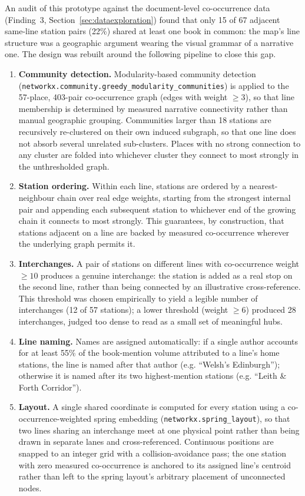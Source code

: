 \documentclass[logo,msc]{infthesis}
\begin{document}
\label{sec:metro-redesign}
An audit of this prototype against the document-level co-occurrence data (Finding~3, Section~\ref{sec:dataexploration}) found that only 15 of 67 adjacent same-line station pairs (22\%) shared at least one book in common: the map's line structure was a geographic argument wearing the visual grammar of a narrative one. The design was rebuilt around the following pipeline to close this gap.

\begin{enumerate}
  \item \textbf{Community detection.} Modularity-based community detection (\texttt{networkx.community.greedy\_modularity\_communities}) is applied to the 57-place, 403-pair co-occurrence graph (edges with weight $\geq 3$), so that line membership is determined by measured narrative connectivity rather than manual geographic grouping. Communities larger than 18 stations are recursively re-clustered on their own induced subgraph, so that one line does not absorb several unrelated sub-clusters. Places with no strong connection to any cluster are folded into whichever cluster they connect to most strongly in the unthresholded graph.
  \item \textbf{Station ordering.} Within each line, stations are ordered by a nearest-neighbour chain over real edge weights, starting from the strongest internal pair and appending each subsequent station to whichever end of the growing chain it connects to most strongly. This guarantees, by construction, that stations adjacent on a line are backed by measured co-occurrence wherever the underlying graph permits it.
  \item \textbf{Interchanges.} A pair of stations on different lines with co-occurrence weight $\geq 10$ produces a genuine interchange: the station is added as a real stop on the second line, rather than being connected by an illustrative cross-reference. This threshold was chosen empirically to yield a legible number of interchanges (12 of 57 stations); a lower threshold (weight $\geq 6$) produced 28 interchanges, judged too dense to read as a small set of meaningful hubs.
  \item \textbf{Line naming.} Names are assigned automatically: if a single author accounts for at least 55\% of the book-mention volume attributed to a line's home stations, the line is named after that author (e.g. ``Welsh's Edinburgh''); otherwise it is named after its two highest-mention stations (e.g. ``Leith \& Forth Corridor'').
  \item \textbf{Layout.} A single shared coordinate is computed for every station using a co-occurrence-weighted spring embedding (\texttt{networkx.spring\_layout}), so that two lines sharing an interchange meet at one physical point rather than being drawn in separate lanes and cross-referenced. Continuous positions are snapped to an integer grid with a collision-avoidance pass; the one station with zero measured co-occurrence is anchored to its assigned line's centroid rather than left to the spring layout's arbitrary placement of unconnected nodes.

\end{enumerate}
\end{document}
